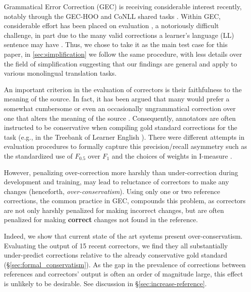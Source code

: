 \documentclass[letterpaper, 11pt]{article}
\begin{document}
%
Grammatical Error Correction (GEC) is receiving considerable
interest recently, notably through the GEC-HOO \cite{dale2011helping,dale2012hoo} and
CoNLL shared tasks \cite{kao2013conll,ng2014conll}.
Within GEC, considerable effort has been placed on evaluation
\cite{tetreault2008native,madnani2011they,felice2015towards,napoles2015ground},
a notoriously difficult challenge, in part due to the many valid corrections a learner's language (LL) sentence may have \cite{chodorow2012problems}. Thus, we chose to take it as the main test case for this paper, in \ref{sec:simplification} we follow the same procedure, with less details over the field of simplification suggesting that our findings are general and apply to various monolingual translation tasks.

An important criterion in the evaluation of correctors is their faithfulness to the meaning of the source. In fact, it has been argued that many would prefer a somewhat cumbersome or even an occasionally ungrammatical correction over one that alters the meaning of the source \cite{brockett2006correcting}.
Consequently, annotators are often instructed to be conservative when compiling gold standard corrections for the task
(e.g., in the Treebank of Learner English \cite{nicholls2003cambridge}).
There were different attempts in evaluation procedures to formally capture this precision/recall asymmetry such as the standardized use of $F_{0.5}$ over $F_{1}$ \cite{dahlmeier2012better} and the choices of weights in I-measure \cite{felice2015towards}.

However, penalizing over-correction more harshly than under-correction during development and training, may lead to reluctance of correctors to make any changes (henceforth, {\it over-conservatism}).
Using only one or two reference corrections, the common practice in GEC, compounds this problem, as correctors are not only harshly penalized for making incorrect changes, but are often penalized for making {\bf correct} changes not found in the reference.

Indeed, we show that current state of the art systems present over-conservatism.
Evaluating the output of 15 recent correctors, we find they all
substantially under-predict corrections relative to the already conservative gold standard
(\S\ref{sec:formal_conservatism}). 
As the gap in the prevalence of corrections between references and correctors' output is often an order of magnitude large, this effect is unlikely to be desirable. See discussion in \S\ref{sec:increase-reference}.
\end{document}
